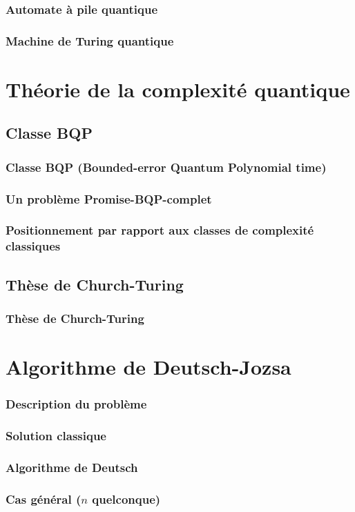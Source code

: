 \documentclass[aspectratio=169]{beamer}
\theoremstyle{plain}
\theoremstyle{definition}
\begin{document}
\begin{frame}
    \frametitle{Automate à pile quantique}
\end{frame}

\begin{frame}
    \frametitle{Machine de Turing quantique}
\end{frame}

\section{Théorie de la complexité quantique}
\subsection{Classe BQP}
\begin{frame}
    \frametitle{Classe BQP (Bounded-error Quantum Polynomial time)}
\end{frame}

\begin{frame}
    \frametitle{Un problème Promise-BQP-complet}
\end{frame}

\begin{frame}
    \frametitle{Positionnement par rapport aux classes de complexité classiques}
\end{frame}

\subsection{Thèse de Church-Turing}
\begin{frame}
    \frametitle{Thèse de Church-Turing}
\end{frame}

\section{Algorithme de Deutsch-Jozsa}
\begin{frame}
    \frametitle{Description du problème}
\end{frame}

\begin{frame}
    \frametitle{Solution classique}
\end{frame}

\begin{frame}
    \frametitle{Algorithme de Deutsch}
\end{frame}

\begin{frame}
    \frametitle{Cas général ($n$ quelconque)}
\end{frame}
\end{document}
